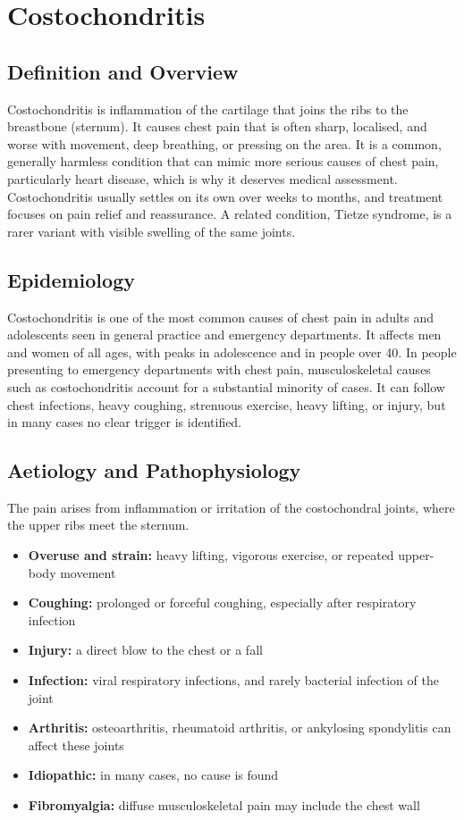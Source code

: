 \chapter{Costochondritis}

\section*{Definition and Overview}
Costochondritis is inflammation of the cartilage that joins the ribs to the breastbone (sternum). It causes chest pain that is often sharp, localised, and worse with movement, deep breathing, or pressing on the area. It is a common, generally harmless condition that can mimic more serious causes of chest pain, particularly heart disease, which is why it deserves medical assessment. Costochondritis usually settles on its own over weeks to months, and treatment focuses on pain relief and reassurance. A related condition, Tietze syndrome, is a rarer variant with visible swelling of the same joints.

\section*{Epidemiology}
Costochondritis is one of the most common causes of chest pain in adults and adolescents seen in general practice and emergency departments. It affects men and women of all ages, with peaks in adolescence and in people over 40. In people presenting to emergency departments with chest pain, musculoskeletal causes such as costochondritis account for a substantial minority of cases. It can follow chest infections, heavy coughing, strenuous exercise, heavy lifting, or injury, but in many cases no clear trigger is identified.

\section*{Aetiology and Pathophysiology}
The pain arises from inflammation or irritation of the costochondral joints, where the upper ribs meet the sternum.

\begin{itemize}
    \item \textbf{Overuse and strain:} heavy lifting, vigorous exercise, or repeated upper-body movement
    \item \textbf{Coughing:} prolonged or forceful coughing, especially after respiratory infection
    \item \textbf{Injury:} a direct blow to the chest or a fall
    \item \textbf{Infection:} viral respiratory infections, and rarely bacterial infection of the joint
    \item \textbf{Arthritis:} osteoarthritis, rheumatoid arthritis, or ankylosing spondylitis can affect these joints
    \item \textbf{Idiopathic:} in many cases, no cause is found
    \item \textbf{Fibromyalgia:} diffuse musculoskeletal pain may include the chest wall
\end{itemize}


